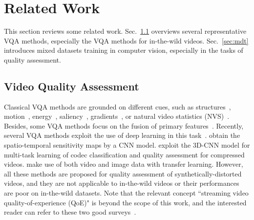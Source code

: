 \documentclass[twocolumn]{svjour3}          \smartqed  \usepackage{graphicx}
\begin{document}
\section{Related Work}
\label{sec:related}
This section reviews some related work. 
Sec.~\ref{sec:vqa} overviews several representative VQA methods, especially the VQA methods for in-the-wild videos. 
Sec.~\ref{sec:mdt} introduces mixed datasets training in computer vision, especially in the tasks of quality assessment.

\subsection{Video Quality Assessment}
\label{sec:vqa}
\indent\indent Classical VQA methods are grounded on different cues, such as structures~\citep{wang2004video,wang2012novel}, motion~\citep{seshadrinathan2010motion,manasa2016optical-NR}, energy~\citep{li2016spatiotemporal}, saliency~\citep{zhang2017study,you2014attention}, gradients~\citep{lu2019spatiotemporal}, or natural video statistics (NVS)~\citep{mittal2016completely,saad2014blind,sinno2019spatio}.
Besides, some VQA methods focus on the fusion of primary features~\citep{freitas2018using,li2016no1}. 
Recently, several VQA methods exploit the use of deep learning in this task~\citep{zhang2018blind,liu2018end,kim2018deep,zhang2019objective}.
\citet{kim2018deep} obtain the spatio-temporal sensitivity maps by a CNN model. 
\citet{liu2018end} exploit the 3D-CNN model for multi-task learning of codec classification and quality assessment for compressed videos. 
\citet{zhang2018blind,zhang2019objective} make use of both video and image data with transfer learning.
However, all these methods are proposed for quality assessment of synthetically-distorted videos, and they are not applicable to in-the-wild videos or their performances are poor on in-the-wild datasets. 
Note that the relevant concept ``streaming video quality-of-experience (QoE)" is beyond the scope of this work, and the interested reader can refer to these two good surveys~\citep{seufert2014survey,juluri2015measurement}.
\end{document}
